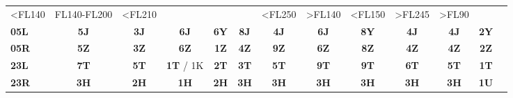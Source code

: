 \documentclass[10pt,landscape,a4paper]{article}
\begin{document}
\begin{textblock}{40}
\begin{table}[]
\begin{tabular}{lcccccccccccc}
\multicolumn{1}{r|}{\scriptsize \textless{}FL140} & 
\multicolumn{1}{r|}{\scriptsize FL140-FL200} & 
\multicolumn{1}{r|}{\scriptsize \textless{}FL210} & 
\multicolumn{1}{r||}{} & 
\multicolumn{1}{r|}{} & 
\multicolumn{1}{r|}{} & 
\multicolumn{1}{r|}{\scriptsize \textless{}FL250} & 
\multicolumn{1}{r|}{\scriptsize \textgreater{}FL140} & 
\multicolumn{1}{r|}{\scriptsize \textless{}FL150} & 
\multicolumn{1}{r|}{\scriptsize \textgreater{}FL245} & 
\multicolumn{1}{l|}{\scriptsize \textgreater{}FL90} & 
\multicolumn{1}{c|}{} \\ \cline{1-12}
\multicolumn{1}{|l|}{\textbf{05L}} & 
\multicolumn{1}{c|}{\textbf{5J}} & 
\multicolumn{1}{c|}{\textbf{3J}} & 
\multicolumn{1}{c|}{\textbf{6J}} & 
\multicolumn{1}{c||}{\textbf{6Y}} & 
\multicolumn{1}{c|}{\textbf{8J}} & 
\multicolumn{1}{c|}{\textbf{4J}} & 
\multicolumn{1}{c|}{\textbf{6J}} & 
\multicolumn{1}{c|}{\textbf{8Y}} & 
\multicolumn{1}{c|}{\textbf{4J}} & 
\multicolumn{1}{c|}{\textbf{4J}} & 
\multicolumn{1}{c|}{\textbf{2Y}} & 
\multicolumn{1}{c|}{} \\ \cline{1-12}
\multicolumn{1}{|l|}{\textbf{05R}} & 
\multicolumn{1}{c|}{\textbf{5Z}} & 
\multicolumn{1}{c|}{\textbf{3Z}} & 
\multicolumn{1}{c|}{\textbf{6Z}} & 
\multicolumn{1}{c||}{\textbf{1Z}} & 
\multicolumn{1}{c|}{\textbf{4Z}} & 
\multicolumn{1}{c|}{\textbf{9Z}} & 
\multicolumn{1}{c|}{\textbf{6Z}} & 
\multicolumn{1}{c|}{\textbf{8Z}} & 
\multicolumn{1}{c|}{\textbf{4Z}} & 
\multicolumn{1}{c|}{\textbf{4Z}} & 
\multicolumn{1}{c|}{\textbf{2Z}} & 
\multicolumn{1}{c|}{} \\ \cline{1-12}
\multicolumn{1}{|l|}{\textbf{23L}} & 
\multicolumn{1}{c|}{\textbf{7T}} & 
\multicolumn{1}{c|}{\textbf{5T}} & 
\multicolumn{1}{c|}{\textbf{1T} / 1K} & 
\multicolumn{1}{c||}{\textbf{2T}} & 
\multicolumn{1}{c|}{\textbf{3T}} & 
\multicolumn{1}{c|}{\textbf{5T}} & 
\multicolumn{1}{c|}{\textbf{9T}} & 
\multicolumn{1}{c|}{\textbf{9T}} & 
\multicolumn{1}{c|}{\textbf{6T}} & 
\multicolumn{1}{c|}{\textbf{5T}} & 
\multicolumn{1}{c|}{\textbf{1T}} & 
\multicolumn{1}{c|}{} \\ \cline{1-12}
\multicolumn{1}{|l|}{\textbf{23R}} & 
\multicolumn{1}{c|}{\textbf{3H}} & 
\multicolumn{1}{c|}{\textbf{2H}} & 
\multicolumn{1}{c|}{\textbf{1H}} & 
\multicolumn{1}{c||}{\textbf{2H}} & 
\multicolumn{1}{c|}{\textbf{3H}} & 
\multicolumn{1}{c|}{\textbf{3H}} & 
\multicolumn{1}{c|}{\textbf{3H}} & 
\multicolumn{1}{c|}{\textbf{3H}} & 
\multicolumn{1}{c|}{\textbf{3H}} & 
\multicolumn{1}{c|}{\textbf{3H}} & 
\multicolumn{1}{c|}{\textbf{1U}} & 
\multicolumn{1}{c|}{} \\ \cline{1-12}

\end{tabular}
\end{table}
\end{textblock}
\end{document}
